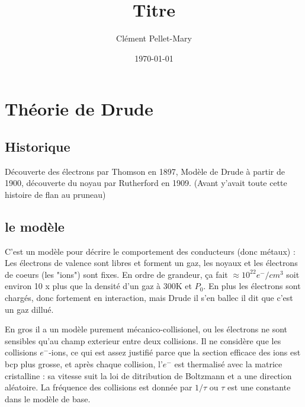 \documentclass[a4paper]{report}
\title{Titre}
\author{Clément Pellet-Mary}
\date\today
\begin{document}
\chapter{Théorie de Drude}
  \section{Historique}
  Découverte des électrons par Thomson en 1897, Modèle de Drude à partir de 1900, découverte du noyau par Rutherford en 1909. (Avant y'avait toute cette histoire de flan au pruneau)
  \section{le modèle}
  C'est un modèle pour décrire le comportement des conducteurs (donc métaux) : Les électrons de valence sont libres et forment un gaz, les noyaux et les électrons de coeurs (les "ions") sont fixes. En ordre de grandeur, ça fait $\approx 10^{22} e^-/cm^3$ soit environ 10 x plus que la densité d'un gaz à 300K et $P_0$. En plus les électrons sont chargés, donc fortement en interaction, mais Drude il s'en ballec il dit que c'est un gaz dillué.
  
  En gros il a un modèle purement mécanico-collisionel, ou les électrons ne sont sensibles qu'au champ exterieur entre deux collisions. Il ne considère que les collisions $e^-$-ions, ce qui est assez justifié parce que la section efficace des ions est bcp plus grosse, et après chaque collision, l'$e^-$ est thermalisé avec la matrice cristalline : sa vitesse suit la loi de ditribution de Boltzmann et a une direction aléatoire. La fréquence des collisions est donnée par $1/\tau$ ou $\tau$ est une constante dans le modèle de base.
\end{document}
